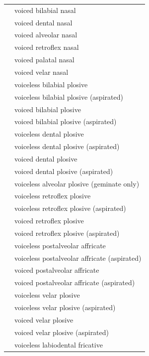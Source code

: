 \documentclass{article}
\begin{document}
\begin{xltabular}{\textwidth}{lL}
   & voiced bilabial nasal \\
   & voiced dental nasal \\
   & voiced alveolar nasal \\
   & voiced retroflex nasal \\
   & voiced palatal nasal \\
   & voiced velar nasal \\
   & voiceless bilabial plosive \\
   & voiceless bilabial plosive (aspirated) \\
   & voiced bilabial plosive \\
   & voiced bilabial plosive (aspirated) \\
   & voiceless dental plosive \\
   & voiceless dental plosive (aspirated) \\
   & voiced dental plosive \\
   & voiced dental plosive (aspirated) \\
   & voiceless alveolar plosive (geminate only) \\
   & voiceless retroflex plosive \\
   & voiceless retroflex plosive (aspirated) \\
   & voiced retroflex plosive \\
   & voiced retroflex plosive (aspirated) \\
   & voiceless postalveolar affricate \\
   & voiceless postalveolar affricate (aspirated) \\
   & voiced postalveolar affricate \\
   & voiced postalveolar affricate (aspirated) \\
   & voiceless velar plosive \\
   & voiceless velar plosive (aspirated) \\
   & voiced velar plosive \\
   & voiced velar plosive (aspirated) \\
   & voiceless labiodental fricative \\

\end{xltabular}
\end{document}
